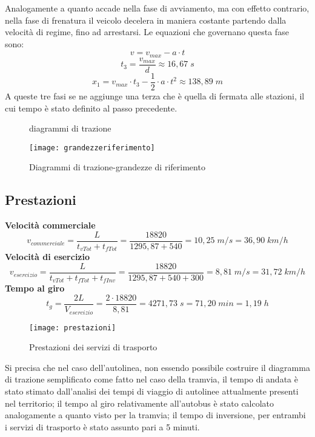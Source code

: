\documentclass{article}
\begin{document}
Analogamente a quanto accade nella fase di avviamento, ma con effetto contrario, nella fase di frenatura il veicolo decelera in maniera costante partendo dalla velocità di regime, fino ad arrestarsi. Le equazioni che governano questa fase sono: 
\begin{equation}
v=v_{max}-a\cdot t
\end{equation}
\begin{equation}
t_3=\frac{v_{max}}{d}\approx16,67\;s
\end{equation}
\begin{equation}
x_1=v_{max}\cdot t_3-\frac{1}{2}\cdot a\cdot t^2\approx 138,89\;m
\end{equation}
A queste tre fasi se ne aggiunge una terza che è quella di fermata alle stazioni, il cui tempo è stato definito al passo precedente. 
\begin{figure}[H]
\centering
{}
\qquad
{}
\caption{diagrammi di trazione}
\end{figure}
\begin{figure}[H]
\centering
\texttt{[image: grandezzeriferimento]}
\caption{Diagrammi di trazione-grandezze di riferimento}
\end{figure}
\subsection{Prestazioni}
\textbf{Velocità commerciale}
\begin{equation}
v_{commerciale}=\frac{L}{t_{vTot}+t_{fTot}}=\frac{18820}{1295,87+540}=10,25\;m/s=36,90\;km/h
\end{equation}
\textbf{Velocità di esercizio}
\begin{equation}
v_{esercizio}=\frac{L}{t_{vTot}+t_{fTot}+t_{fInv}}=\frac{18820}{1295,87+540+300}=8,81\;m/s=31,72\;km/h
\end{equation}
\textbf{Tempo al giro}
\begin{equation}
t_g=\frac{2L}{V_{esercizio}}=\frac{2\cdot 18820}{8,81}=4271,73\;s=71,20\;min=1,19\;h
\end{equation}
\begin{figure}[H]
\centering
\texttt{[image: prestazioni]}
\caption{Prestazioni dei servizi di trasporto}
\end{figure}
Si precisa che nel caso dell’autolinea, non essendo possibile costruire il diagramma di trazione semplificato come fatto nel caso della tramvia, il tempo di andata è stato stimato dall’analisi dei tempi di viaggio di autolinee attualmente presenti nel territorio; il tempo al giro relativamente all’autobus è stato calcolato analogamente a quanto visto per la tramvia; il tempo di inversione, per entrambi i servizi di trasporto è stato assunto pari a 5 minuti.
\end{document}
